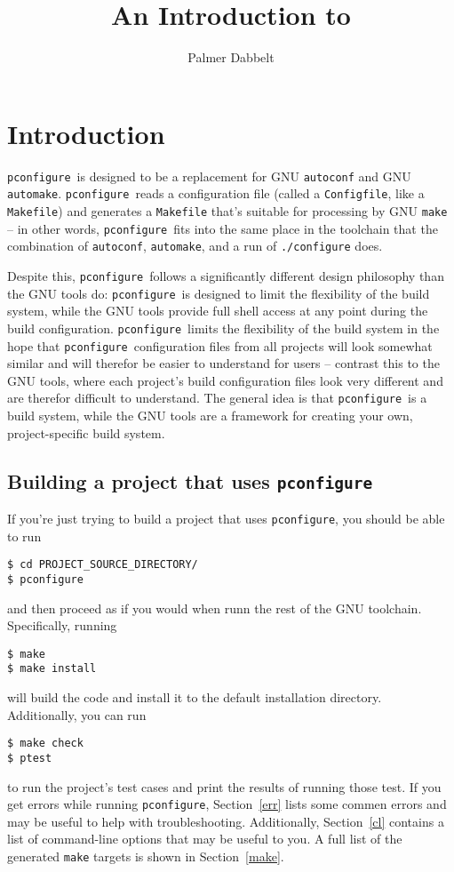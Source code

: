 \documentclass{article}
\title{An Introduction to \pconfigure}
\author{Palmer Dabbelt}
\newcommand{\pconfigure}{\texttt{pconfigure}}
\begin{document}
\maketitle
\begin{multicols}{2}
\small
\tableofcontents
\end{multicols}
\clearpage

\section{Introduction}

\pconfigure\ is designed to be a replacement for GNU \texttt{autoconf}
and GNU \texttt{automake}.  \pconfigure\ reads a configuration file
(called a \texttt{Configfile}, like a \texttt{Makefile}) and generates
a \texttt{Makefile} that's suitable for processing by GNU
\texttt{make} -- in other words, \pconfigure\ fits into the same place
in the toolchain that the combination of \texttt{autoconf},
\texttt{automake}, and a run of \texttt{./configure} does.

Despite this, \pconfigure\ follows a significantly different design
philosophy than the GNU tools do: \pconfigure\ is designed to limit
the flexibility of the build system, while the GNU tools provide full
shell access at any point during the build configuration.
\pconfigure\ limits the flexibility of the build system in the hope
that \pconfigure\ configuration files from all projects will look
somewhat similar and will therefor be easier to understand for users
-- contrast this to the GNU tools, where each project's build
configuration files look very different and are therefor difficult to
understand.  The general idea is that \pconfigure\ is a build system,
while the GNU tools are a framework for creating your own,
project-specific build system.

\subsection{Building a project that uses \pconfigure}

If you're just trying to build a project that uses \pconfigure, you
should be able to run
\begin{verbatim}
$ cd PROJECT_SOURCE_DIRECTORY/
$ pconfigure
\end{verbatim}
and then proceed as if you would when runn the rest of the GNU
toolchain.  Specifically, running
\begin{verbatim}
$ make
$ make install
\end{verbatim}
will build the code and install it to the default installation
directory.  Additionally, you can run
\begin{verbatim}
$ make check
$ ptest
\end{verbatim}
to run the project's test cases and print the results of running those
test.  If you get errors while running \pconfigure, Section~\ref{err}
lists some commen errors and may be useful to help with
troubleshooting.  Additionally, Section~\ref{cl} contains a list of
command-line options that may be useful to you.  A full list of the
generated \texttt{make} targets is shown in Section~\ref{make}.
\end{document}
